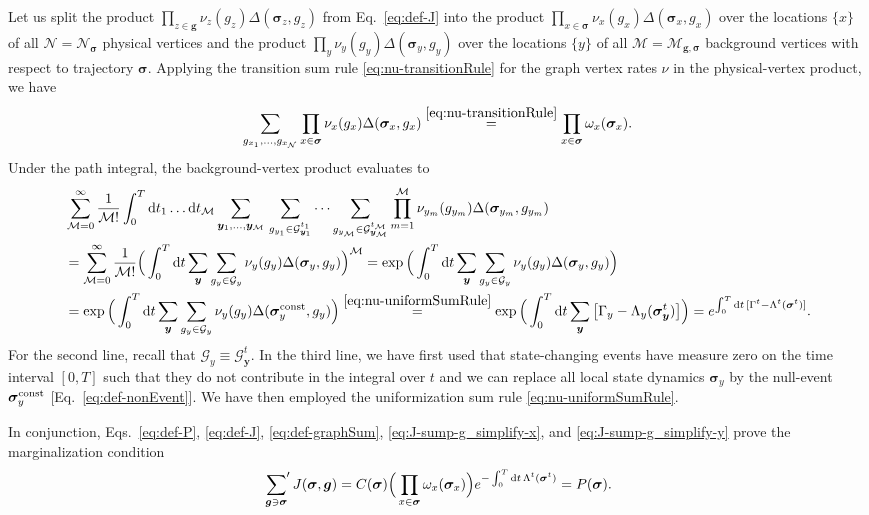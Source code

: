 \documentclass[english,10pt,aps,pra,twocolumn,superscriptaddress,floatfix,fleqn]{revtex4-2}
\newcommand{\ud}{\mathrm{d}}
\newcommand{\mc}[1]{\mathcal{#1}}
\renewcommand{\vec}[1]{{\boldsymbol{#1}}}
\newcommand{\G} {\mc{G}}
\newcommand{\vg}{\vec{g}}
\newcommand{\vs}{\vec{\sigma}}
\newcommand{\vy}{\vec{y}}
\newcommand{\Np}{\mc{N}}
\newcommand{\Nb}{\mc{M}}
\newcommand{\sump}{\sideset{}{'}\sum}
\newcommand{\const}{\textnormal{const}}
\begin{document}
Let us split the product $\prod_{z\in\vg}\nu_z(g_z)\Delta(\vs_z,g_z)$ from Eq.~\eqref{eq:def-J} into the product $\prod_{x\in\vs}\nu_x(g_x)\Delta(\vs_x,g_x)$ over the locations $\{x\}$ of all $\Np=\Np_\vs$ physical vertices and the product $\prod_{y}\nu_y(g_y)\Delta(\vs_y,g_y)$ over the locations $\{y\}$ of all $\Nb=\Nb_{\vg,\vs}$ background vertices with respect to trajectory $\vs$. Applying the transition sum rule \eqref{eq:nu-transitionRule} for the graph vertex rates $\nu$ in the physical-vertex product, we have
\begin{equation}\label{eq:J-sump-g_simplify-x}
	\sum_{g_{x_1},\dotsc,g_{x_\Np}} \prod_{x\in\vs}\nu_x(g_x)\Delta(\vs_x,g_x)
	\stackrel{\eqref{eq:nu-transitionRule}}{=} \prod_{x\in\vs}\omega_x(\vs_x).
\end{equation}
Under the path integral, the background-vertex product evaluates to
\begin{align}\nonumber
	&\sum_{\Nb=0}^\infty \frac{1}{\Nb!}\int_0^T \ud t_1\dots\ud t_\Nb 
	\sum_{\vy_1,\dotsc,\vy_\Nb}\,\sum_{g_{y_1}\in\G_{\vy_1}^{t_1}}\dots\sum_{g_{y_\Nb}\in\G_{\vy_\Nb}^{t_\Nb}}
	\prod_{m=1}^\Nb \nu_{y_m}(g_{y_m})\Delta(\vs_{y_m},g_{y_m}) \\\nonumber
	&=\sum_{\Nb=0}^\infty \frac{1}{\Nb!}\Big(\int_0^T \ud t\sum_\vy \sum_{g_y\in\G_y}\nu_y(g_y)\Delta(\vs_y,g_y)\Big)^\Nb
	 =\exp\Big(\int_0^T \ud t\sum_\vy \sum_{g_y\in\G_y}\nu_y(g_y)\Delta(\vs_y,g_y)\Big)\\
	&=\exp\Big(\int_0^T \ud t\sum_\vy \sum_{g_y\in\G_y}\nu_y(g_y)\Delta(\vs_y^{\const},g_y)\Big)
	 \stackrel{\eqref{eq:nu-uniformSumRule}}{=}
	  \exp\Big(\int_0^T \ud t\sum_\vy \big[\Gamma_y - \Lambda_y(\vs_\vy^t)\big]\Big)
	 =e^{\int_0^T\ud t\,[\Gamma^t-\Lambda^t(\vs^t)]}.
	\label{eq:J-sump-g_simplify-y}
\end{align}
For the second line, recall that $\G_y\equiv\G_\vy^t$. In the third line, we have first used that state-changing events have measure zero on the time interval $[0,T]$ such that they do not contribute in the integral over $t$ and we can replace all local state dynamics $\vs_y$ by the null-event $\vs_y^{\const}$ [Eq.~\eqref{eq:def-nonEvent}]. We have then employed the uniformization sum rule \eqref{eq:nu-uniformSumRule}.

In conjunction, Eqs.~\eqref{eq:def-P}, \eqref{eq:def-J}, \eqref{eq:def-graphSum}, \eqref{eq:J-sump-g_simplify-x}, and \eqref{eq:J-sump-g_simplify-y} prove the marginalization condition
\begin{equation}\label{eq:Jmarginal-step2}
	\sump_{\vg\ni\vs} J(\vs,\vg) =
	C(\vs) \Big(\prod_{x\in\vs}\omega_x(\vs_x)\Big) e^{-\int_0^T\ud t\,\Lambda^t(\vs^t)}
	=P(\vs).
\end{equation}
\end{document}
